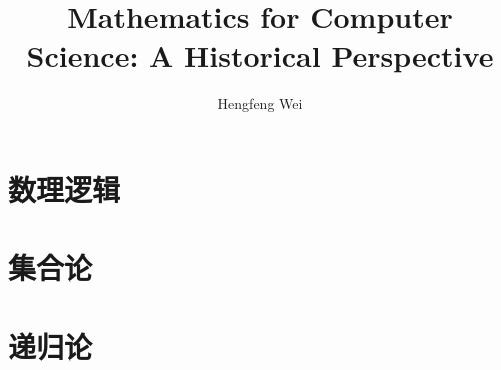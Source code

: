 \documentclass{amsbook}
\begin{document}
\frontmatter
\title[math4cs-history]{Mathematics for Computer Science: A Historical Perspective}
\author[hengxin]{Hengfeng Wei}
\address[NJU]{Nanjing University\\
Nanjing, China}



\maketitle
\tableofcontents



\mainmatter

\part{数理逻辑}


\part{集合论}



\part{递归论}


\backmatter\appendix

% 
\end{document}
